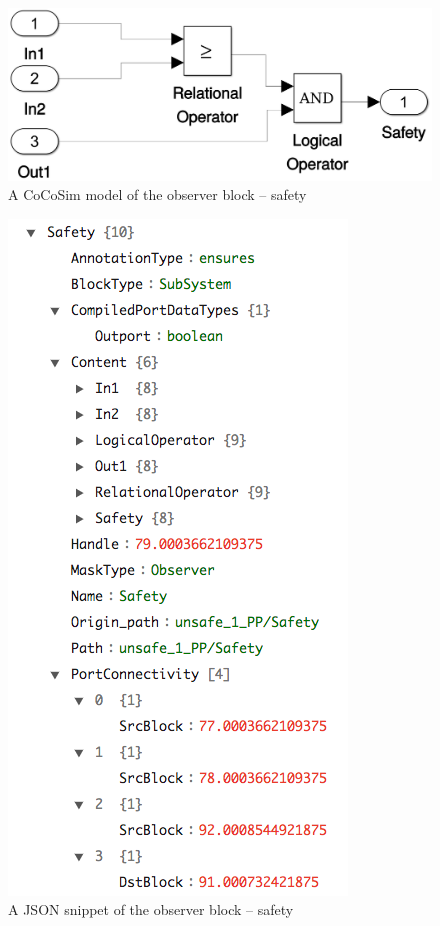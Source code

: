 \documentclass{article}
\begin{document}
\begin{figure}[h]
\begin{center}
  \includegraphics[scale=0.15]{figures/safety0}
\end{center}  
  \caption{A CoCoSim model of the observer block -- safety}
  \label{cocosimsafety}
\end{figure}


\begin{figure}[h]
\begin{center}
  \includegraphics[scale=0.35]{figures/safety}
\end{center}  
  \caption{A JSON snippet of the observer block -- safety}
  \label{jsonsafety}
\end{figure}
\end{document}
